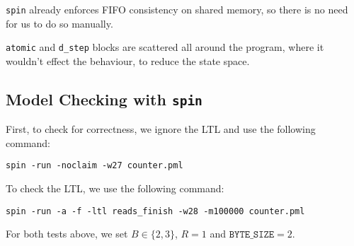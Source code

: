\documentclass[a4paper]{scrartcl}
\begin{document}
\texttt{spin} already enforces FIFO consistency on shared memory, so there is no need for us to do so manually.

\texttt{atomic} and \texttt{d\_step} blocks are scattered all around the program, where it wouldn't effect the behaviour, to reduce the state space.

\subsection{Model Checking with \texttt{spin}}
First, to check for correctness, we ignore the LTL and use the following command:
\begin{lstlisting}
spin -run -noclaim -w27 counter.pml
\end{lstlisting}

To check the LTL, we use the following command:
\begin{lstlisting}
spin -run -a -f -ltl reads_finish -w28 -m100000 counter.pml
\end{lstlisting}

For both tests above, we set \(B \in \{2, 3\}\), \(R = 1\) and \(\texttt{BYTE\_SIZE} = 2\).
\end{document}

